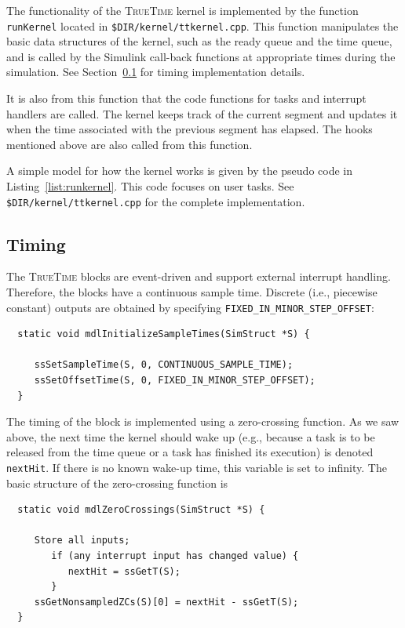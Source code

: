 \documentclass[final,twoside]{rapport}
\begin{document}
The functionality of the \textsc{TrueTime} kernel is implemented by
the function \linebreak \texttt{runKernel} located in
\texttt{\$DIR/kernel/ttkernel.cpp}. This function manipulates the
basic data structures of the kernel, such as the ready queue and the
time queue, and is called by the Simulink call-back functions at
appropriate times during the simulation. See Section~\ref{sec:timing}
for timing implementation details.

It is also from this function that the code functions for tasks and
interrupt handlers are called. The kernel keeps track of the current
segment and updates it when the time associated with the previous
segment has elapsed. The hooks mentioned above are also called from
this function.

A simple model for how the kernel works is given by the pseudo code in
Listing~\ref{list:runkernel}. This code focuses on user tasks. See
\texttt{\$DIR/kernel/ttkernel.cpp} for the complete implementation.

\subsection{Timing}
\label{sec:timing}
The \textsc{TrueTime} blocks are event-driven and support external
interrupt handling. Therefore, the blocks have a continuous sample
time. Discrete (i.e., piecewise constant) outputs are obtained by
specifying {\tt FIXED\_IN\_MINOR\_STEP\_OFFSET}:
\begin{small}
\begin{verbatim}
  static void mdlInitializeSampleTimes(SimStruct *S) {

     ssSetSampleTime(S, 0, CONTINUOUS_SAMPLE_TIME);
     ssSetOffsetTime(S, 0, FIXED_IN_MINOR_STEP_OFFSET);
  }
\end{verbatim}
\end{small}

The timing of the block is implemented using a zero-crossing function.
As we saw above, the next time the kernel should wake up (e.g.,
because a task is to be released from the time queue or a task has
finished its execution) is denoted {\tt nextHit}. If there is no known
wake-up time, this variable is set to infinity. The basic structure of
the zero-crossing function is
\begin{small}
\begin{verbatim}
  static void mdlZeroCrossings(SimStruct *S) {

     Store all inputs;
        if (any interrupt input has changed value) {
           nextHit = ssGetT(S);
        }
     ssGetNonsampledZCs(S)[0] = nextHit - ssGetT(S);
  }
\end{verbatim}
\end{small}
\end{document}
